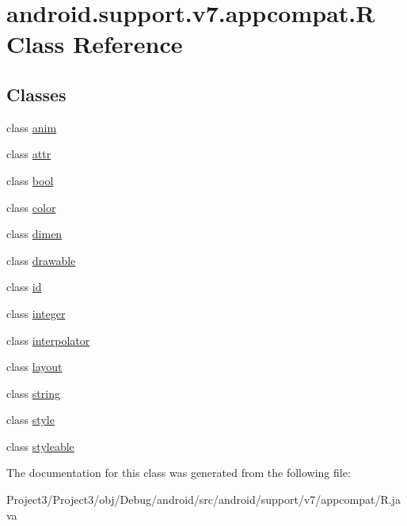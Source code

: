 \hypertarget{classandroid_1_1support_1_1v7_1_1appcompat_1_1R}{}\section{android.\+support.\+v7.\+appcompat.\+R Class Reference}
\label{classandroid_1_1support_1_1v7_1_1appcompat_1_1R}
\subsection*{Classes}
\begin{DoxyCompactItemize}
\item 
class \hyperlink{classandroid_1_1support_1_1v7_1_1appcompat_1_1R_1_1anim}{anim}
\item 
class \hyperlink{classandroid_1_1support_1_1v7_1_1appcompat_1_1R_1_1attr}{attr}
\item 
class \hyperlink{classandroid_1_1support_1_1v7_1_1appcompat_1_1R_1_1bool}{bool}
\item 
class \hyperlink{classandroid_1_1support_1_1v7_1_1appcompat_1_1R_1_1color}{color}
\item 
class \hyperlink{classandroid_1_1support_1_1v7_1_1appcompat_1_1R_1_1dimen}{dimen}
\item 
class \hyperlink{classandroid_1_1support_1_1v7_1_1appcompat_1_1R_1_1drawable}{drawable}
\item 
class \hyperlink{classandroid_1_1support_1_1v7_1_1appcompat_1_1R_1_1id}{id}
\item 
class \hyperlink{classandroid_1_1support_1_1v7_1_1appcompat_1_1R_1_1integer}{integer}
\item 
class \hyperlink{classandroid_1_1support_1_1v7_1_1appcompat_1_1R_1_1interpolator}{interpolator}
\item 
class \hyperlink{classandroid_1_1support_1_1v7_1_1appcompat_1_1R_1_1layout}{layout}
\item 
class \hyperlink{classandroid_1_1support_1_1v7_1_1appcompat_1_1R_1_1string}{string}
\item 
class \hyperlink{classandroid_1_1support_1_1v7_1_1appcompat_1_1R_1_1style}{style}
\item 
class \hyperlink{classandroid_1_1support_1_1v7_1_1appcompat_1_1R_1_1styleable}{styleable}
\end{DoxyCompactItemize}


The documentation for this class was generated from the following file\+:\begin{DoxyCompactItemize}
\item 
Project3/\+Project3/obj/\+Debug/android/src/android/support/v7/appcompat/R.\+java\end{DoxyCompactItemize}
